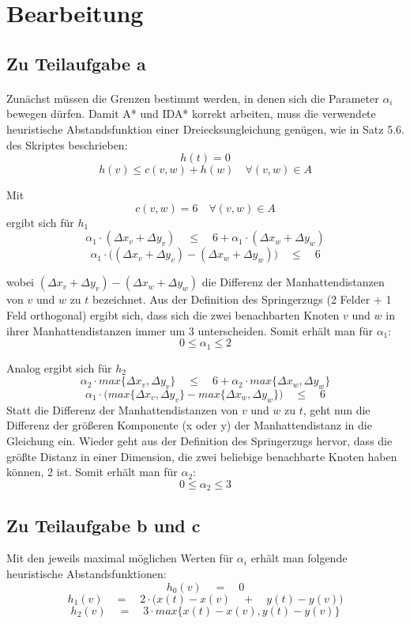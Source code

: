 \section{ Bearbeitung }\label{se:method}

\subsection*{ Zu Teilaufgabe a }
\paragraph*{}
Zunächst müssen die Grenzen bestimmt werden, in denen sich die Parameter $\alpha_i$ bewegen dürfen.
Damit A* und IDA* korrekt arbeiten, muss die verwendete heuristische Abstandsfunktion einer 
Dreiecksungleichung genügen, wie in Satz 5.6. des Skriptes beschrieben:
\[ h(t) = 0 \]
\[ h(v) \leq c(v,w) + h(w) \quad \forall (v,w) \in A \]

Mit 
\[ c(v,w) = 6 \quad \forall (v,w) \in A \]
ergibt sich für $h_1$
\[ \alpha_1\cdot(\Delta x_v + \Delta y_v) \quad\leq\quad 6 + \alpha_1\cdot(\Delta x_w + \Delta y_w) \]
\[ \alpha_1\cdot\Big( (\Delta x_v + \Delta y_v) - (\Delta x_w + \Delta y_w) \Big) \quad\leq\quad 6 \]

wobei $(\Delta x_v + \Delta y_v) - (\Delta x_w + \Delta y_w)$ die Differenz der Manhattendistanzen von 
$v$ und $w$ zu $t$ bezeichnet. Aus der Definition des Springerzugs (2 Felder + 1 Feld orthogonal) ergibt 
sich, dass sich die zwei benachbarten Knoten $v$ und $w$ in ihrer Manhattendistanzen immer um 3 unterscheiden.
Somit erhält man für $\alpha_1$:
\[ 0 \leq \alpha_1 \leq 2 \]

Analog ergibt sich für $h_2$
\[ \alpha_2\cdot max\{\Delta x_v, \Delta y_v\} \quad\leq\quad 6 + \alpha_2\cdot max\{\Delta x_w, \Delta y_w\} \]
\[ \alpha_1\cdot\Big( max\{\Delta x_v,\Delta y_v\}-max\{\Delta x_w,\Delta y_w\} \Big) \quad\leq\quad 6 \]
Statt die Differenz der Manhattendistanzen von $v$ und $w$ zu $t$, geht nun die Differenz der größeren 
Komponente (x oder y) der Manhattendistanz in die Gleichung ein.
\newline
Wieder geht aus der Definition des Springerzugs hervor, dass die größte Distanz in einer Dimension, die zwei 
beliebige benachbarte Knoten haben können, 2 ist.
Somit erhält man für $\alpha_2$:
\[ 0 \leq \alpha_2 \leq 3 \]


\clearpage


\subsection*{ Zu Teilaufgabe b und c }
Mit den jeweils maximal möglichen Werten für $\alpha_i$ erhält man folgende heuristische Abstandsfunktionen:
\[ h_0(v) \quad = \quad 0 \]
\[ h_1(v) \quad = \quad 2\cdot\Big( x(t)-x(v) \quad+\quad y(t)-y(v) \Big) \]
\[ h_2(v) \quad = \quad 3\cdot max\{x(t)-x(v), y(t)-y(v)\} \]

